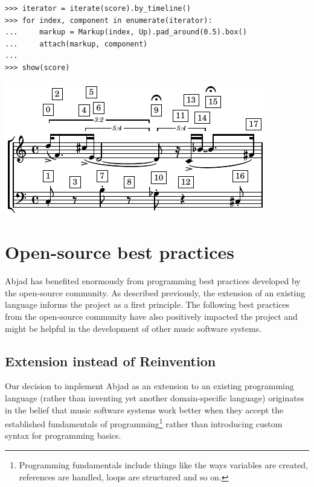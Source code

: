 \documentclass{article}
\begin{document}

\begin{lstlisting}
>>> iterator = iterate(score).by_timeline()
>>> for index, component in enumerate(iterator):
...     markup = Markup(index, Up).pad_around(0.5).box()
...     attach(markup, component)
...
>>> show(score)
\end{lstlisting}
\includegraphics{assets/lilypond-2456d51cfca254abae0bf44f6030df7a.pdf}

\section{Open-source best practices} \label{sec:open-source}

Abjad has benefited enormously from programming best practices developed by the
open-source community. As described previously, the extension of an existing
language informs the project as a first principle. The following best practices
from the open-source community have also positively impacted the project and
might be helpful in the development of other music software systems.

\subsection{Extension instead of Reinvention}

Our decision to implement Abjad as an extension to an existing
programming language (rather than inventing yet another domain-specific
language) originates in the belief that music software systems work better when
they accept the established fundamentals of programming\footnote{Programming
fundamentals include things like the ways variables are created, references are
handled, loops are structured and so on.} rather than introducing custom syntax
for programming basics.
\end{document}
